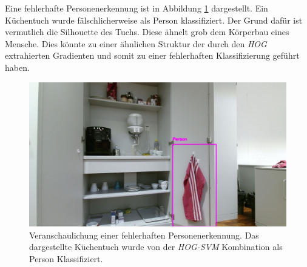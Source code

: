 Eine fehlerhafte Personenerkennung ist in Abbildung \ref{fig: hogtest} dargestellt. Ein Küchentuch wurde fälschlicherweise als Person klassifiziert. Der Grund dafür ist vermutlich die Silhouette des Tuchs. Diese ähnelt grob dem Körperbau eines Mensche. Dies könnte zu einer ähnlichen Struktur der durch den \textit{HOG} extrahierten Gradienten und somit zu einer fehlerhaften Klassifizierung geführt haben.

	\begin{figure}[H]
	\centering
	\includegraphics[width=1\textwidth]{Bilder/80.jpg}
	\caption{Veranschaulichung einer fehlerhaften Personenerkennung. Das dargestellte Küchentuch wurde von der \textit{HOG-SVM} Kombination als Person Klassifiziert.}
	\label{fig: hogtest}
\end{figure}
